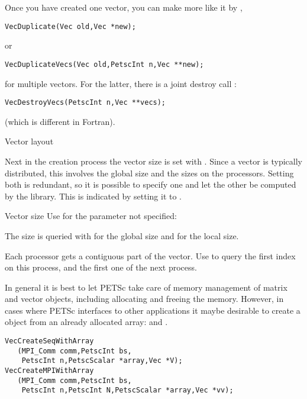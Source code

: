 Once you have created one vector, you can make more like it by
,
\begin{lstlisting}
VecDuplicate(Vec old,Vec *new);
\end{lstlisting}
or 
\begin{lstlisting}
VecDuplicateVecs(Vec old,PetscInt n,Vec **new);
\end{lstlisting}
for multiple vectors.
For the latter, there is a joint destroy call
:
\begin{lstlisting}
VecDestroyVecs(PetscInt n,Vec **vecs);
\end{lstlisting}
(which is different in Fortran).

 {Vector layout}

Next in the creation process the vector size is set with .
Since a
vector is typically distributed, this involves the global size and the
sizes on the processors. Setting both is redundant, so it is possible
to specify one and let the other be computed by the library. This is
indicated by setting it to .

\begin{pythonnote}{Vector size}
  Use  for the parameter not specified:
\end{pythonnote}

The size is queried with  for the global size
and  for the local size.

Each processor gets a contiguous part of the vector. Use
 to query the first index on this
process, and the first one of the next process.

In general it is best to let PETSc take care of memory management of
matrix and vector objects, including allocating and freeing the memory.
However, in cases where PETSc interfaces to other applications it maybe desirable
to create a  object from an already
allocated array:  and
.
\begin{lstlisting}
VecCreateSeqWithArray
   (MPI_Comm comm,PetscInt bs,
    PetscInt n,PetscScalar *array,Vec *V);
VecCreateMPIWithArray
   (MPI_Comm comm,PetscInt bs,
    PetscInt n,PetscInt N,PetscScalar *array,Vec *vv);  
\end{lstlisting}

